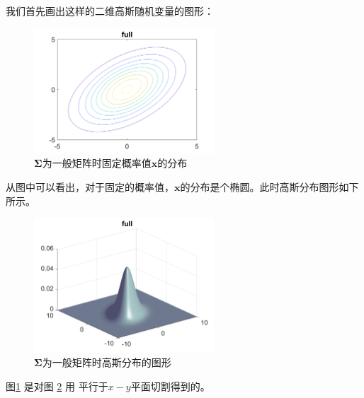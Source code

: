 \documentclass[10pt,a4paper,UTF8]{article}
\begin{document}
我们首先画出这样的二维高斯随机变量的图形：
\begin{figure}[htbp]
\centering
\includegraphics[width=0.6\textwidth]{../../img/computer_prml/20170625figure2dgaussFull.png}
\caption{\label{fig:orgd5c559e}
\(\mathbf{\Sigma}\)为一般矩阵时固定概率值\(\mathbf{x}\)的分布}
\end{figure}

从图中可以看出，对于固定的概率值，\(\mathbf{x}\)的分布是个椭圆。此时高斯分布图形如下所示。

\begin{figure}[htbp]
\centering
\includegraphics[width=0.6\textwidth]{../../img/computer_prml/20170625figure2dgaussFullsurface.png}
\caption{\label{fig:orgaaac3d2}
\(\mathbf{\Sigma}\)为一般矩阵时高斯分布的图形}
\end{figure}

图\ref{fig:orgd5c559e} 是对图 \ref{fig:orgaaac3d2} 用  平行于\(x-y\)平面切割得到的。
\end{document}
